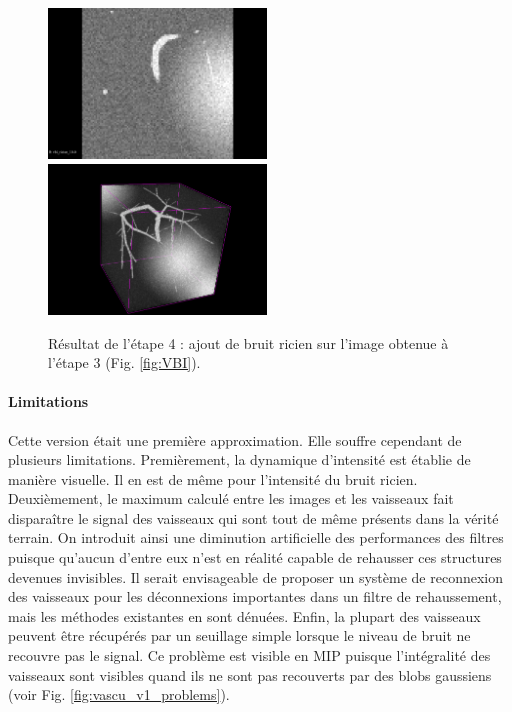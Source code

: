 \begin{figure}[!ht]
  \centering
  \includegraphics[height=4cm]{Images/2D_VBIR10.png}
  \includegraphics[height=4cm]{Images/3D_VBIR10.png}
  
  \caption{Résultat de l'étape 4 : ajout de bruit ricien sur l'image obtenue à l'étape 3 (Fig. \ref{fig:VBI}).}
  \label{fig:VBIR}
\end{figure}

\paragraph{Limitations} Cette version était une première approximation. Elle souffre cependant de plusieurs limitations. Premièrement, la dynamique d'intensité est établie de manière visuelle. Il en est de même pour l'intensité du bruit ricien. Deuxièmement, le maximum calculé entre les images et les vaisseaux fait disparaître le signal des vaisseaux qui sont tout de même présents dans la vérité terrain. On introduit ainsi une diminution artificielle des performances des filtres puisque qu'aucun d'entre eux n'est en réalité capable de rehausser ces structures devenues invisibles. Il serait envisageable de proposer un système de reconnexion des vaisseaux pour les déconnexions importantes dans un filtre de rehaussement, mais les méthodes existantes en sont dénuées. Enfin, la plupart des vaisseaux peuvent être récupérés par un seuillage simple lorsque le niveau de bruit ne recouvre pas le signal. Ce problème est visible en MIP puisque l'intégralité des vaisseaux sont visibles quand ils ne sont pas recouverts par des blobs gaussiens (voir Fig. \ref{fig:vascu_v1_problems}).

